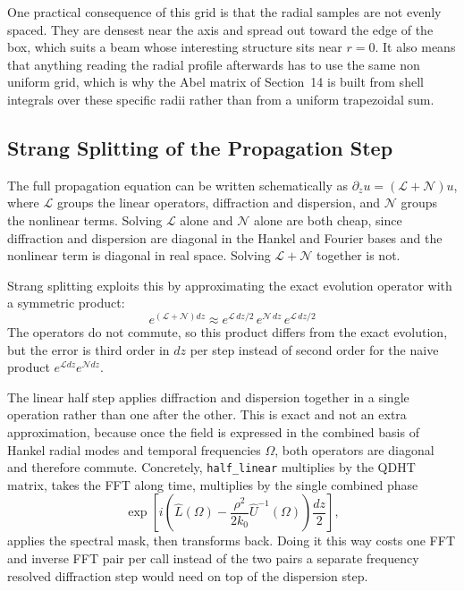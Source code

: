 One practical consequence of this grid is that the radial samples are not evenly spaced. They are densest near the axis and spread out toward the edge of the box, which suits a beam whose interesting structure sits near $r=0$. It also means that anything reading the radial profile afterwards has to use the same non uniform grid, which is why the Abel matrix of Section~14 is built from shell integrals over these specific radii rather than from a uniform trapezoidal sum.

\subsection{Strang Splitting of the Propagation Step}

The full propagation equation can be written schematically as $\partial_z u = (\mathcal{L}+\mathcal{N})u$, where $\mathcal{L}$ groups the linear operators, diffraction and dispersion, and $\mathcal{N}$ groups the nonlinear terms. Solving $\mathcal{L}$ alone and $\mathcal{N}$ alone are both cheap, since diffraction and dispersion are diagonal in the Hankel and Fourier bases and the nonlinear term is diagonal in real space. Solving $\mathcal{L}+\mathcal{N}$ together is not.

Strang splitting exploits this by approximating the exact evolution operator with a symmetric product:
\begin{equation}
e^{(\mathcal{L}+\mathcal{N})dz} \approx e^{\mathcal{L}\,dz/2}\,e^{\mathcal{N}\,dz}\,e^{\mathcal{L}\,dz/2}
\end{equation}
The operators do not commute, so this product differs from the exact evolution, but the error is third order in $dz$ per step instead of second order for the naive product $e^{\mathcal{L}dz}e^{\mathcal{N}dz}$.

The linear half step applies diffraction and dispersion together in a single operation rather than one after the other. This is exact and not an extra approximation, because once the field is expressed in the combined basis of Hankel radial modes and temporal frequencies $\Omega$, both operators are diagonal and therefore commute. Concretely, \texttt{half\_linear} multiplies by the QDHT matrix, takes the FFT along time, multiplies by the single combined phase
\begin{equation}
\exp\!\left[i\left(\hat{L}(\Omega) - \frac{\rho^2}{2k_0}\hat{U}^{-1}(\Omega)\right)\frac{dz}{2}\right],
\end{equation}
applies the spectral mask, then transforms back. Doing it this way costs one FFT and inverse FFT pair per call instead of the two pairs a separate frequency resolved diffraction step would need on top of the dispersion step.

